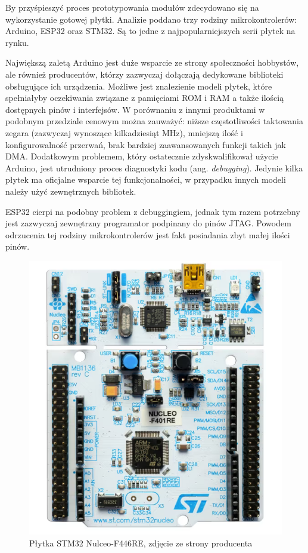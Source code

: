 By przyśpieszyć proces prototypowania modułów zdecydowano się na wykorzystanie gotowej płytki. Analizie poddano trzy rodziny mikrokontrolerów: Arduino, ESP32 oraz STM32. Są to jedne z najpopularniejszych serii płytek na rynku. 

Największą zaletą Arduino jest duże wsparcie ze strony społeczności hobbystów, ale również producentów, którzy zazwyczaj dołączają dedykowane biblioteki obsługujące ich urządzenia. Możliwe jest znalezienie modeli płytek, które spełniałyby oczekiwania związane z pamięciami ROM i RAM a także ilością dostępnych pinów i interfejsów. W porównaniu z innymi produktami w podobnym przedziale cenowym można zauważyć: niższe częstotliwości taktowania zegara (zazwyczaj wynoszące kilkadziesiąt MHz), mniejszą ilość i konfigurowalność przerwań, brak bardziej zaawansowanych funkcji takich jak DMA. Dodatkowym problemem, który ostatecznie zdyskwalifikował użycie Arduino, jest utrudniony proces diagnostyki kodu (ang. \textit{debugging}). Jedynie kilka płytek ma oficjalne wsparcie tej funkcjonalności, w przypadku innych modeli należy użyć zewnętrznych bibliotek.

ESP32 cierpi na podobny problem z debuggingiem, jednak tym razem potrzebny jest zazwyczaj zewnętrzny programator podpinany do pinów JTAG. Powodem odrzucenia tej rodziny mikrokontrolerów jest fakt posiadania zbyt małej ilości pinów.

\begin{figure}[ht!]
    \centering
    \includegraphics[width=0.4\linewidth]{rysunki/gizmo/nucleo.png}
    \caption{Płytka STM32 Nulceo-F446RE, zdjęcie ze strony producenta}
    \label{fig: stm32}
\end{figure} 


